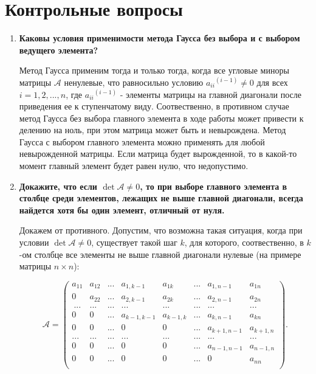 \documentclass[12pt, a4paper]{article}
\begin{document}
\newpage

\section{Контрольные вопросы}
\begin{enumerate}
 \item {\bf Каковы условия применимости метода Гаусса без выбора
и с выбором ведущего элемента?}

Метод Гаусса применим тогда и только тогда, когда все угловые миноры матрицы $\mathcal{A}$ ненулевые, что равносильно условию ${a_{ii}}^{(i-1)} \ne 0$ для всех $i = 1,2 , ..., n$, где ${a_{ii}}^{(i-1)}$ - элементы матрицы на главной диагонали после приведения ее к ступенчатому виду. Соотвественно, в противном случае метод Гаусса без выбора главного элемента в ходе работы может привести к делению на ноль, при этом матрица может быть и невырождена. Метод Гаусса с выбором главного элемента можно применять для любой невырожденной матрицы. Если матрица будет вырожденной, то в какой-то момент главный элемент будет равен нулю, что недопустимо. 

 \item {\bf Докажите, что если $\det \mathcal{A} \ne 0$, то при выборе главного
элемента в столбце среди элементов, лежащих не выше
главной диагонали, всегда найдется хотя бы один элемент,
отличный от нуля.}

Докажем от противного. Допустим, что возможна такая ситуация, когда при условии $\det \mathcal{A} \ne 0$, существует такой шаг $k$, для которого, соотвественно, в $k$-ом столбце все элементы не выше главной диагонали нулевые (на примере матрицы $n\times n$):

\[  \mathcal{A} = 
\begin{pmatrix}
a_{11} & a_{12} & ...& a_{1,k-1}&a_{1k}&...& a_{1, n-1} & a_{1n}\\
0 & a_{22} & ...& a_{2,k-1}&a_{2k} &...& a_{2, n-1} & a_{2n}\\\
... & ... & ...& ...& ... & ... & ... & ...\\
0 & 0 & ...& a_{k-1, k-1} &a_{k-1, k} & ... & a_{k, n-1}& a_{k n}\\
0 & 0 & ...& 0 &0 & ... & a_{k +1, n-1}& a_{k+1, n}\\
... & ... & ...& ... & ... & ... & ...&...\\
0 & 0 & ...& 0&0 & ... & a_{n-1, n-1} & a_{n-1, n}\\
0 & 0 & ...&0&0 & ... & 0 & a_{nn}\\
\end{pmatrix}.
\]


\end{enumerate}
\end{document}
